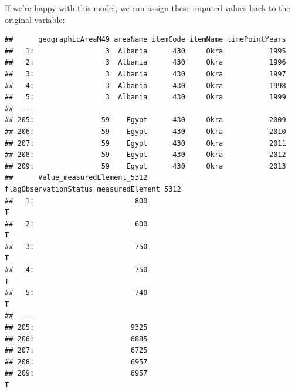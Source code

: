 \documentclass[nojss]{jss}
\begin{document}
If we're happy with this model, we can assign these imputed values back to the
original variable:

\begin{knitrout}
\color{fgcolor}\begin{kframe}
\begin{alltt}
\hlopt{$} \hlkwb{=} 
\hlstd{(}   
\hlstd{okraProcessed[,} \hlstd{(}\hlstd{,} \hlstd{,}
                  \hlstd{)} \hlkwb{:=} \hlstd{]}
\end{alltt}
\begin{verbatim}
##      geographicAreaM49 areaName itemCode itemName timePointYears
##   1:                 3  Albania      430     Okra           1995
##   2:                 3  Albania      430     Okra           1996
##   3:                 3  Albania      430     Okra           1997
##   4:                 3  Albania      430     Okra           1998
##   5:                 3  Albania      430     Okra           1999
##  ---                                                            
## 205:                59    Egypt      430     Okra           2009
## 206:                59    Egypt      430     Okra           2010
## 207:                59    Egypt      430     Okra           2011
## 208:                59    Egypt      430     Okra           2012
## 209:                59    Egypt      430     Okra           2013
##      Value_measuredElement_5312 flagObservationStatus_measuredElement_5312
##   1:                        800                                          T
##   2:                        600                                          T
##   3:                        750                                          T
##   4:                        750                                          T
##   5:                        740                                          T
##  ---                                                                      
## 205:                       9325                                           
## 206:                       6885                                           
## 207:                       6725                                           
## 208:                       6957                                           
## 209:                       6957                                          T

\end{verbatim}
\end{kframe}
\end{knitrout}
\end{document}
